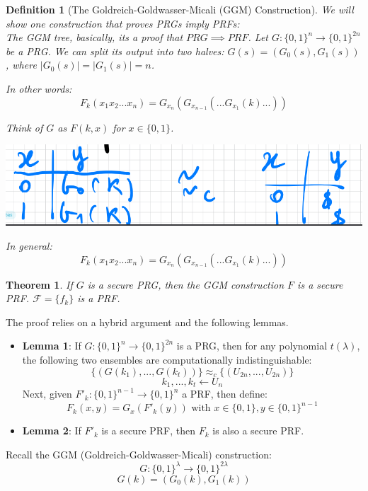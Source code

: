 \documentclass[11pt, a4paper]{article}
\newtheorem{thm}{Theorem}
\newtheorem{defn}{Definition}
\begin{document}
\begin{defn}[The Goldreich-Goldwasser-Micali (GGM) Construction]
We will show one construction that proves PRGs imply PRFs:\\
The GGM tree, basically, its a proof that $PRG \implies PRF$.
Let $G: \{0,1\}^n \to \{0,1\}^{2n}$ be a PRG. We can split its output into two halves: $G(s) = (G_0(s), G_1(s))$, where $|G_0(s)| = |G_1(s)| = n$.


In other words:
$$ F_k(x_1x_2...x_n) = G_{x_n}(G_{x_{n-1}}(...G_{x_1}(k)...)) $$

Think of $G$ as $F(k,x)$ for $x \in \{0,1\}$.
\begin{center}
\includegraphics[scale=0.4]{img/Comp_sec/PRF2.png}
\end{center}

\begin{center}
\end{center}
In general:\\
$$ F_k(x_1x_2...x_n) = G_{x_n}(G_{x_{n-1}}(...G_{x_1}(k)...)) $$
\end{defn}
\begin{thm}
    If $G$ is a secure PRG, then the GGM construction $F$ is a secure PRF. $\mathcal{F} = \{ f_k \}$ is a PRF.
\end{thm}
The proof relies on a hybrid argument and the following lemmas.

\begin{itemize}
    \item \textbf{Lemma 1}: If $G: \{0,1\}^n \to \{0,1\}^{2n}$ is a PRG, then for any polynomial $t(\lambda)$, the following two ensembles are computationally indistinguishable:
    $$ \{ (G(k_1), ..., G(k_t)) \} \approx_c \{ (U_{2n}, ..., U_{2n}) \}$$
    $$ k_1, ... , k_t \leftarrow U_n $$
    Next, given $F'_k \colon \{0,1\}^{n-1} \to \{0,1\}^n$ a PRF, then define:
    $$ F_k(x,y) = G_x(F'_{k}(y)) \text{ with } x \in \{0,1\}, y \in \{0,1\}^{n-1} $$
    \item \textbf{Lemma 2}: If $F'_k$ is a secure PRF, then $F_k$ is also a secure PRF.
\end{itemize}
Recall the GGM (Goldreich-Goldwasser-Micali) construction: 
$$ G:\{0,1\}^{\lambda}\rightarrow\{0,1\}^{2\lambda} $$ 
$$ G(k)=(G_{0}(k),G_{1}(k)) $$ 
\end{document}
